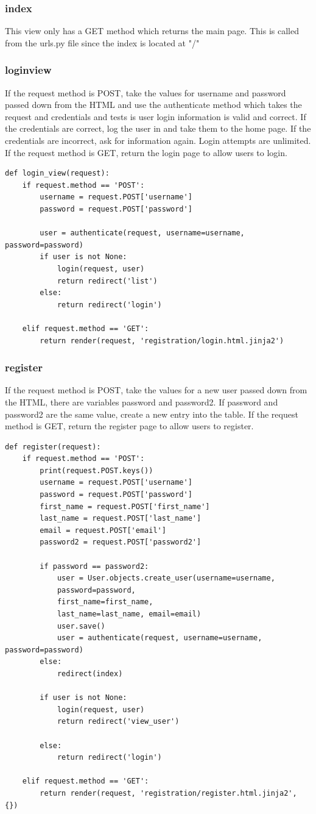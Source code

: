 \subsubsection{index}
This view only has a GET method which returns the main page. This is called from the urls.py file since the index is located at "/"
\subsubsection{login\textunderscore view}
If the request method is POST, take the values for username and password passed down from the HTML and use the authenticate method which takes the request and credentials and tests is user login information is valid and correct.
If the credentials are correct, log the user in and take them to the home page.
If the credentials are incorrect, ask for information again. Login attempts are unlimited.
If the request method is GET, return the login page to allow users to login.
\begin{verbatim}
def login_view(request):
    if request.method == 'POST':
        username = request.POST['username']
        password = request.POST['password']

        user = authenticate(request, username=username, password=password)
        if user is not None:
            login(request, user)
            return redirect('list')
        else:
            return redirect('login')

    elif request.method == 'GET':
        return render(request, 'registration/login.html.jinja2')    
\end{verbatim}
\subsubsection{register}
If the request method is POST, take the values for a new user passed down from the HTML, there are variables password and password2. If password and password2 are the same value, create a new entry into the table.
If the request method is GET, return the register page to allow users to register.
\begin{verbatim}
def register(request):
    if request.method == 'POST':
        print(request.POST.keys())
        username = request.POST['username']
        password = request.POST['password']
        first_name = request.POST['first_name']
        last_name = request.POST['last_name']
        email = request.POST['email']
        password2 = request.POST['password2']

        if password == password2:
            user = User.objects.create_user(username=username,
            password=password, 
            first_name=first_name,
            last_name=last_name, email=email)
            user.save()
            user = authenticate(request, username=username, password=password)
        else:
            redirect(index)

        if user is not None:
            login(request, user)
            return redirect('view_user')

        else:
            return redirect('login')

    elif request.method == 'GET':
        return render(request, 'registration/register.html.jinja2', {})    
\end{verbatim}

